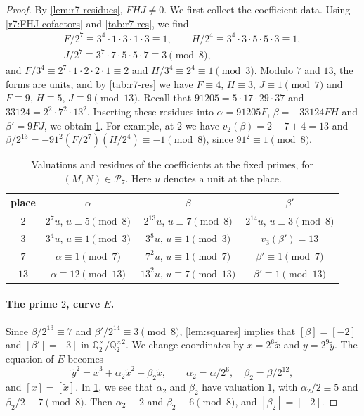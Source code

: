 \documentclass[12pt,oneside,openany]{book}
\theoremstyle{definition}
\theoremstyle{plain}
\numberwithin{equation}{chapter}
\theoremstyle{plain}
\theoremstyle{definition}
\theoremstyle{remark}
\newcommand{\Q}{\mathbb Q}
\newcommand{\sq}[1]{[#1]}
\newcommand{\sqgp}[1]{#1^{\times}/#1^{\times2}}
\newcommand{\cP}{\mathcal P}
\begin{document}
\begin{proof}
By \cref{lem:r7-residues}, $FHJ\ne0$. We first collect the coefficient data.
Using \eqref{r7:FHJ-cofactors} and \cref{tab:r7-res}, we find
\[
\begin{gathered}
 F/2^7\equiv3^4\cdot1\cdot3\cdot1\cdot3\equiv1,\qquad
 H/2^4\equiv3^4\cdot3\cdot5\cdot5\cdot3\equiv1,\\
 J/2^7\equiv3^7\cdot7\cdot5\cdot5\cdot7\equiv3\pmod8,
\end{gathered}
\]
and $F/3^4\equiv2^7\cdot1\cdot2\cdot2\cdot1\equiv2$ and
$H/3^4\equiv2^4\equiv1\pmod3$. Modulo $7$ and $13$, the forms are units, and by
\cref{tab:r7-res} we have $F\equiv4$, $H\equiv3$, $J\equiv1\pmod7$ and
$F\equiv9$, $H\equiv5$, $J\equiv9\pmod{13}$. Recall that
$91205=5\cdot17\cdot29\cdot37$ and $33124=2^2\cdot7^2\cdot13^2$. Inserting
these residues into $\alpha=91205F$, $\beta=-33124FH$ and $\beta'=9FJ$, we
obtain \cref{tab:r7-coef-local}. For example, at $2$ we have
$v_2(\beta)=2+7+4=13$ and
$\beta/2^{13}=-91^2(F/2^7)(H/2^4)\equiv-1\pmod8$, since $91^2\equiv1\pmod8$.

\begin{table}[htbp]
\centering
\caption{Valuations and residues of the coefficients at the fixed primes,
for $(M,N)\in\cP_7$. Here $u$ denotes a unit at the place.}
\label{tab:r7-coef-local}
\begin{tabular}{cccc}
\toprule
place & $\alpha$ & $\beta$ & $\beta'$\\
\midrule
$2$ & $2^7u$, $u\equiv5\pmod 8$ & $2^{13}u$, $u\equiv7\pmod8$ & $2^{14}u$, $u\equiv3\pmod8$\\
$3$ & $3^4u$, $u\equiv1\pmod3$ & $3^8u$, $u\equiv1\pmod3$ & $v_3(\beta')=13$\\
$7$ & $\alpha\equiv1\pmod7$ & $7^2u$, $u\equiv1\pmod7$ & $\beta'\equiv1\pmod7$\\
$13$ & $\alpha\equiv12\pmod{13}$ & $13^2u$, $u\equiv7\pmod{13}$ & $\beta'\equiv1\pmod{13}$\\
\bottomrule
\end{tabular}
\end{table}

\paragraph{The prime $2$, curve $E$.}
Since $\beta/2^{13}\equiv7$ and $\beta'/2^{14}\equiv3\pmod8$,
\cref{lem:squares} implies that $\sq\beta=\sq{-2}$ and $\sq{\beta'}=\sq3$ in
$\sqgp{\Q_2}$. We change coordinates by $x=2^6\tilde x$ and $y=2^9\tilde y$. The equation
of $E$ becomes
\[
 \tilde y^2=\tilde x^3+\alpha_2\tilde x^2+\beta_2\tilde x,\qquad \alpha_2=\alpha/2^6,\quad
 \beta_2=\beta/2^{12},
\]
and $\sq x=\sq{\tilde x}$. In \cref{tab:r7-coef-local}, we see that $\alpha_2$ and
$\beta_2$ have valuation $1$, with $\alpha_2/2\equiv5$ and
$\beta_2/2\equiv7\pmod8$. Then $\alpha_2\equiv2$ and $\beta_2\equiv6\pmod8$, and $\sq{\beta_2}=\sq{-2}$.


\end{proof}
\end{document}
